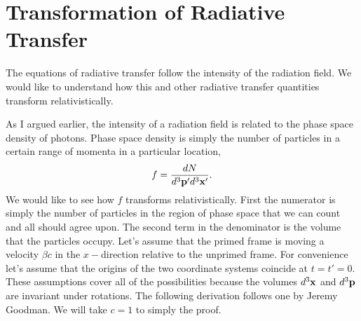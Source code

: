 \section{Transformation of Radiative Transfer}
\label{sec:transf-radi-transf}
The equations of radiative transfer follow the intensity of the
radiation field.  We would like to understand how this and other
radiative transfer quantities transform relativistically.

As I argued earlier, the intensity of a radiation field is related to
the phase space density of photons.  Phase space density is simply the
number of particles in a certain range of momenta in a particular
location,
\begin{equation}
f = \frac{d N}{d^3 {\bf p}' d^3 {\bf x}'}.
\label{eq:313}
\end{equation}
We would like to see how $f$ transforms relativistically.   First the
numerator is simply the number of particles in the region of phase
space that we can count and all should agree upon.   The second term
in the denominator is the volume that the particles occupy.  Let's
assume that the primed frame is moving a velocity $\beta c$ in the
$x-$direction relative to the unprimed frame.  For convenience let's
assume that the origins of the two coordinate systems coincide at
$t=t'=0$.  These assumptions cover all of the possibilities because
the volumes $d^3 {\bf x}$ and $d^3 {\bf p}$ are invariant under
rotations.  The following derivation follows one by Jeremy Goodman.
We will take $c=1$ to simply the proof.

